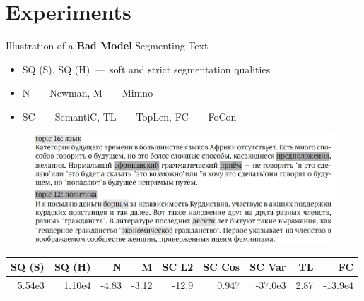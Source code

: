 \documentclass[russian]{beamer}
\begin{document}
\section{Experiments}

\begin{frame}{Illustration of a \textbf{Bad Model} Segmenting Text}
  \normalsize
  
  \begin{itemize}\setlength{\leftmargin}{0pt}
  \item SQ (S), SQ (H)~---~soft and strict segmentation qualities
  \item N~---~Newman, M~---~Mimno
  \item SC~---~SemantiC, TL~---~TopLen, FC~---~FoCon
  \end{itemize}

  \begin{figure}[h]
    \centering
    \includegraphics[width=\textwidth]{combine_bad.jpg}
  \end{figure}
    
  \smallskip

  \begin{table}[h]
    \scriptsize
    \centering
    \begin{tabular}{rrrrrrrrr}
      SQ (S) & SQ (H) & N & M & SC L2 & SC Cos & SC Var & TL & FC\\
      \midrule
      5.54e3 & 1.10e4 & -4.83 & -3.12 & -12.9 & 0.947 & -37.0e3 & 2.87 & -13.9e4\\
    \end{tabular}
  \end{table}
\end{frame}
\end{document}

